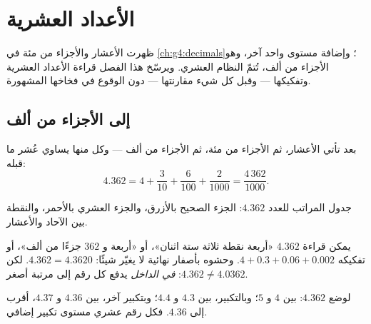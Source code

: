 \chapter{الأعداد العشرية}\label{ch:g5:decimals}

ظهرت الأعشار والأجزاء من مئة في \cref{ch:g4:decimals}؛ وإضافة
مستوى واحد آخر، وهو الأجزاء من ألف، تُتمّ النظام العشري. ويرسّخ
هذا الفصل قراءة الأعداد العشرية وتفكيكها --- وقبل كل شيء
مقارنتها --- دون الوقوع في فخاخها المشهورة.

\section{إلى الأجزاء من ألف}

\begin{definition}\label{def:g5:decimals:places}
بعد  تأتي الأعشار، ثم الأجزاء من مئة، ثم
الأجزاء من ألف --- وكل منها يساوي عُشر ما قبله:
\[
4.362 = 4 + \frac{3}{10} + \frac{6}{100} + \frac{2}{1000}
= \frac{4\,362}{1000}.
\]
\end{definition}

\begin{omfigure}

{\small جدول المراتب للعدد $4.362$: الجزء الصحيح بالأزرق، والجزء
العشري بالأحمر، والنقطة بين الآحاد والأعشار.}
\end{omfigure}

\begin{example}\label{ex:g5:decimals:readings}
يمكن قراءة $4.362$ «أربعة نقطة ثلاثة ستة اثنان»، أو «أربعة
و $362$ جزءًا من ألف»، أو تفكيكه $4 + 0.3 + 0.06 + 0.002$. وحشوه
بأصفار نهائية لا يغيّر شيئًا: $4.362 = 4.3620$. لكن
$4.362 \neq 4.0362$:  \emph{في الداخل} يدفع كل رقم إلى
مرتبة أصغر.
\end{example}

\begin{example}\label{ex:g5:decimals:line}
لوضع $4.362$: بين $4$ و $5$؛ وبالتكبير، بين $4.3$ و
$4.4$؛ وبتكبير آخر، بين $4.36$ و $4.37$، أقرب إلى $4.36$.
فكل رقم عشري مستوى تكبير إضافي.
\end{example}

